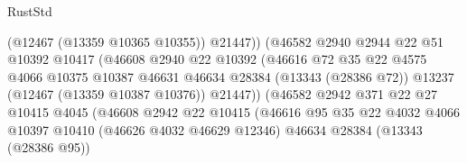 \begin{lexlean}{RustStd}
\begin{coremodule}
                                          (@12467 (@13359 @10365 @10355))
                                          @21447))
                                      (@46582
                                        @2940
                                        @2944
                                        @22
                                        @51
                                        @10392
                                        @10417
                                        (@46608
                                          @2940
                                          @22
                                          @10392
                                          (@46616
                                            @72
                                            @35
                                            @22
                                            @4575
                                            @4066
                                            @10375
                                            @10387
                                            @46631
                                            @46634
                                            @28384
                                            (@13343 (@28386 @72))
                                            @13237
                                            (@12467 (@13359 @10387 @10376))
                                            @21447))
                                        (@46582
                                          @2942
                                          @371
                                          @22
                                          @27
                                          @10415
                                          @4045
                                          (@46608
                                            @2942
                                            @22
                                            @10415
                                            (@46616
                                              @95
                                              @35
                                              @22
                                              @4032
                                              @4066
                                              @10397
                                              @10410
                                              (@46626 @4032 @46629 @12346)
                                              @46634
                                              @28384
                                              (@13343 (@28386 @95))

\end{coremodule}
\end{lexlean}

